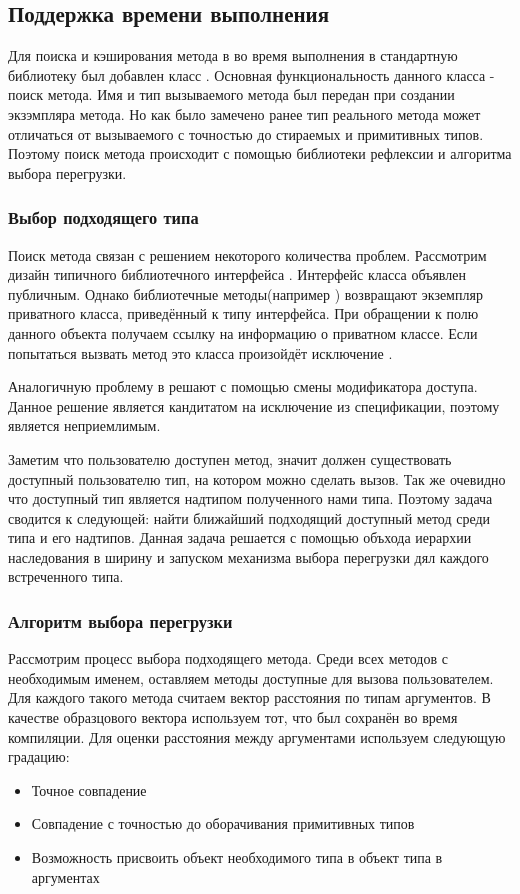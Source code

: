 \subsection{Поддержка времени выполнения}
Для поиска и кэширования метода в во время выполнения в стандартную библиотеку был добавлен класс . Основная функциональность данного класса - поиск метода. Имя и тип вызываемого метода был передан при создании экзэмпляра метода. Но как было замечено ранее тип реального метода может отличаться от вызываемого с точностью до стираемых и примитивных типов. Поэтому поиск метода происходит с помощью библиотеки рефлексии и алгоритма выбора перегрузки.

\subsubsection{Выбор подходящего типа}
Поиск метода связан с решением некоторого количества проблем. Рассмотрим дизайн типичного библиотечного интерфейса . Интерфейс класса объявлен публичным. Однако библиотечные методы(например ) возвращают экземпляр приватного класса, приведённый к типу интерфейса. При обращении к полю  данного объекта получаем ссылку на информацию о приватном классе. Если попытаться вызвать метод это класса произойдёт исключение .

Аналогичную проблему в  решают с помощью смены модификатора доступа. Данное решение является кандитатом на исключение из спецификации, поэтому является неприемлимым.

Заметим что пользователю доступен метод, значит должен существовать доступный пользователю тип, на котором можно сделать вызов. Так же очевидно что доступный тип является надтипом полученного нами типа. Поэтому задача сводится к следующей: найти ближайший подходящий доступный метод среди типа и его надтипов. Данная задача решается с помощью объхода иерархии наследования в ширину и запуском механизма выбора перегрузки дял каждого встреченного типа.

\subsubsection{Алгоритм выбора перегрузки}
Рассмотрим процесс выбора подходящего метода. Среди всех методов с необходимым именем, оставляем методы доступные для вызова пользователем. Для каждого такого метода считаем вектор расстояния по типам аргументов. В качестве образцового вектора используем тот, что был сохранён во время компиляции. Для оценки расстояния между аргументами используем следующую градацию:
\begin{itemize}
    \item Точное совпадение
    \item Совпадение с точностью до оборачивания примитивных типов
    \item Возможность присвоить объект необходимого типа в объект типа в аргументах
\end{itemize}

